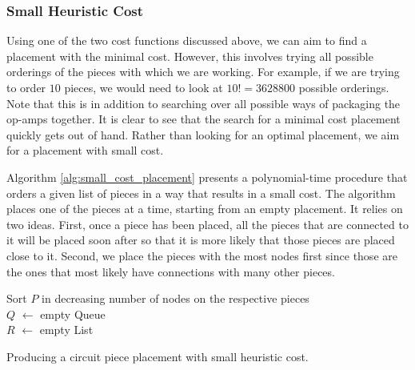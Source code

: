 \subsubsection{Small Heuristic Cost}

Using one of the two cost functions discussed above, we can aim to find a
placement with the minimal cost. However, this involves trying all possible
orderings of the pieces with which we are working. For example, if we are trying
to order $10$ pieces, we would need to look at $10! = 3628800$ possible
orderings. Note that this is in addition to
searching over all possible ways
of packaging the op-amps together. It is clear to see that the search for a
minimal cost placement quickly gets out of hand.
Rather than looking for an optimal placement, we aim for a placement with small
cost.

Algorithm \ref{alg:small_cost_placement} presents a polynomial-time procedure
that orders a
given list of pieces in a way that results in a small cost. The algorithm places
one of the pieces at a time, starting from an empty placement. It relies
on two ideas. First, once a piece has been placed, all the pieces that are
connected to it will be placed soon after so that it is more likely that those
pieces are placed close to it. Second, we place the pieces with the most nodes
first since those are the ones that most likely have connections with many other
pieces.

\begin{algorithm}
\BlankLine
Sort $P$ in decreasing number of nodes on the respective pieces\\
$Q$ $\leftarrow$ empty Queue\\
$R$ $\leftarrow$ empty List\\
\caption{Producing a circuit piece placement with small heuristic cost.}
\label{alg:small_cost_placement}
\end{algorithm}


